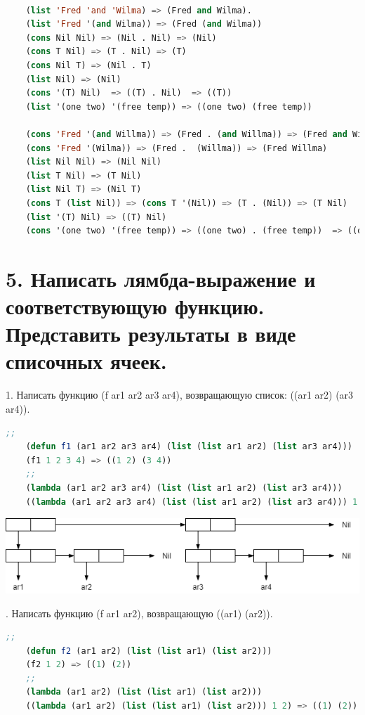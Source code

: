 \documentclass[12pt]{report}
\begin{document}
	
\clearpage

\begin{lstlisting}[language=Lisp]

	(list 'Fred 'and 'Wilma) => (Fred and Wilma). 
	(list 'Fred '(and Wilma)) => (Fred (and Wilma))
	(cons Nil Nil) => (Nil . Nil) => (Nil)
	(cons T Nil) => (T . Nil) => (T)
	(cons Nil T) => (Nil . T)
	(list Nil) => (Nil)
	(cons '(T) Nil)	 => ((T) . Nil)	 => ((T))
	(list '(one two) '(free temp)) => ((one two) (free temp))
	
	(cons 'Fred '(and Willma)) => (Fred . (and Willma)) => (Fred and Willma)
	(cons 'Fred '(Wilma)) => (Fred .  (Willma)) => (Fred Willma)
	(list Nil Nil) => (Nil Nil)
	(list T Nil) => (T Nil)
	(list Nil T) => (Nil T)
	(cons T (list Nil)) => (cons T '(Nil)) => (T . (Nil)) => (T Nil)
	(list '(T) Nil) => ((T) Nil)
	(cons '(one two) '(free temp)) => ((one two) . (free temp))  => ((one two) free temp)
\end{lstlisting}

\section*{5. Написать лямбда-выражение и соответствующую функцию. Представить результаты в виде списочных ячеек.}


1. Написать функцию (f ar1 ar2 ar3 ar4), возвращающую список: ((ar1 ar2) (ar3 ar4)).
\begin{lstlisting}[language=Lisp]
	;; 
	(defun f1 (ar1 ar2 ar3 ar4) (list (list ar1 ar2) (list ar3 ar4)))
	(f1 1 2 3 4) => ((1 2) (3 4))
	;; 
	(lambda (ar1 ar2 ar3 ar4) (list (list ar1 ar2) (list ar3 ar4)))
	((lambda (ar1 ar2 ar3 ar4) (list (list ar1 ar2) (list ar3 ar4))) 1 2 3 4) => ((1 2) (3 4))
\end{lstlisting}

%

\includegraphics[scale=0.7]{img/1}

. Написать функцию (f ar1 ar2), возвращающую ((ar1) (ar2)).
\begin{lstlisting}[language=Lisp]
	;;
	(defun f2 (ar1 ar2) (list (list ar1) (list ar2)))
	(f2 1 2) => ((1) (2))
	;;
	(lambda (ar1 ar2) (list (list ar1) (list ar2)))
	((lambda (ar1 ar2) (list (list ar1) (list ar2))) 1 2) => ((1) (2))
\end{lstlisting}
\end{document}

